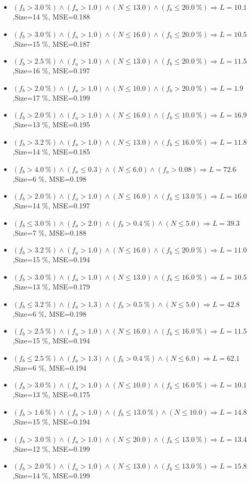 \documentclass[numbered]{CSL}
\begin{document}
\begin{itemize}
\item $(f_b > 3.0~\%) \land (f_a > 1.0) \land (N \leq 13.0) \land (f_b \leq 20.0~\%) \Rightarrow L = 10.1$,\hfill Size=14 \%, MSE=0.188
\item $(f_b > 3.0~\%) \land (f_a > 1.0) \land (N \leq 16.0) \land (f_b \leq 20.0~\%) \Rightarrow L = 10.5$,\hfill Size=15 \%, MSE=0.187
\item $(f_b > 2.5~\%) \land (f_a > 1.0) \land (N \leq 13.0) \land (f_b \leq 20.0~\%) \Rightarrow L = 11.5$,\hfill Size=16 \%, MSE=0.197
\item $(f_b > 2.0~\%) \land (f_a > 1.0) \land (N \leq 10.0) \land (f_b > 20.0~\%) \Rightarrow L = 1.9$,\hfill Size=17 \%, MSE=0.199
\item $(f_b > 2.0~\%) \land (f_a > 1.0) \land (N \leq 16.0) \land (f_b \leq 10.0~\%) \Rightarrow L = 16.9$,\hfill Size=13 \%, MSE=0.195
\item $(f_b > 3.2~\%) \land (f_a > 1.0) \land (N \leq 13.0) \land (f_b \leq 16.0~\%) \Rightarrow L = 11.8$,\hfill Size=14 \%, MSE=0.185
\item $(f_b > 4.0~\%) \land (f_a \leq 0.3) \land (N \leq 6.0) \land (f_a > 0.08) \Rightarrow L = 72.6$,\hfill Size=6 \%, MSE=0.198
\item $(f_b > 2.0~\%) \land (f_a > 1.0) \land (N \leq 16.0) \land (f_b \leq 13.0~\%) \Rightarrow L = 16.0$,\hfill Size=14 \%, MSE=0.197
\item $(f_b \leq 3.0~\%) \land (f_a > 2.0) \land (f_b > 0.4~\%) \land (N \leq 5.0) \Rightarrow L = 39.3$,\hfill Size=7 \%, MSE=0.188
\item $(f_b > 3.2~\%) \land (f_a > 1.0) \land (N \leq 16.0) \land (f_b \leq 20.0~\%) \Rightarrow L = 11.0$,\hfill Size=15 \%, MSE=0.194
\item $(f_b > 3.0~\%) \land (f_a > 1.0) \land (N \leq 13.0) \land (f_b \leq 16.0~\%) \Rightarrow L = 10.5$,\hfill Size=13 \%, MSE=0.179
\item $(f_b \leq 3.2~\%) \land (f_a > 1.3) \land (f_b > 0.5~\%) \land (N \leq 5.0) \Rightarrow L = 42.8$,\hfill Size=6 \%, MSE=0.198
\item $(f_b > 2.5~\%) \land (f_a > 1.0) \land (N \leq 16.0) \land (f_b \leq 16.0~\%) \Rightarrow L = 11.5$,\hfill Size=15 \%, MSE=0.194
\item $(f_b \leq 2.5~\%) \land (f_a > 1.3) \land (f_b > 0.4~\%) \land (N \leq 6.0) \Rightarrow L = 62.1$,\hfill Size=6 \%, MSE=0.194
\item $(f_b > 3.0~\%) \land (f_a > 1.0) \land (N \leq 10.0) \land (f_b \leq 16.0~\%) \Rightarrow L = 10.1$,\hfill Size=13 \%, MSE=0.175
\item $(f_b > 1.6~\%) \land (f_a > 1.0) \land (f_b \leq 13.0~\%) \land (N \leq 10.0) \Rightarrow L = 14.8$,\hfill Size=15 \%, MSE=0.194
\item $(f_b > 3.0~\%) \land (f_a > 1.0) \land (N \leq 20.0) \land (f_b \leq 13.0~\%) \Rightarrow L = 13.4$,\hfill Size=12 \%, MSE=0.199
\item $(f_b > 2.0~\%) \land (f_a > 1.0) \land (N \leq 13.0) \land (f_b \leq 13.0~\%) \Rightarrow L = 15.8$,\hfill Size=14 \%, MSE=0.199
\end{itemize}
\end{document}
